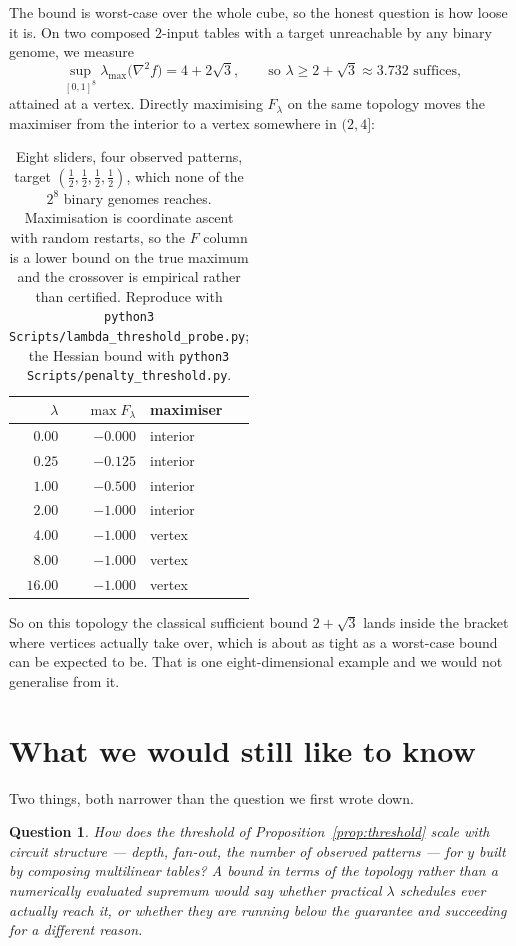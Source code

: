 \documentclass[11pt,a4paper]{article}
\newtheorem{question}{Question}
\begin{document}
The bound is worst-case over the whole cube, so the honest question is how loose
it is. On two composed $2$-input tables with a target unreachable by any binary
genome, we measure
\[
  \sup_{[0,1]^8}\lambda_{\max}\bigl(\nabla^2 f\bigr) = 4+2\sqrt3,
  \qquad\text{so } \lambda \ge 2+\sqrt3 \approx 3.732 \text{ suffices,}
\]
attained at a vertex. Directly maximising $F_\lambda$ on the same topology moves
the maximiser from the interior to a vertex somewhere in $(2,4]$:

\begin{table}[h]
\centering
\small
\begin{tabular}{@{}rrl@{}}
\toprule
$\lambda$ & $\max F_\lambda$ & maximiser \\
\midrule
$0.00$  & $-0.000$ & interior \\
$0.25$  & $-0.125$ & interior \\
$1.00$  & $-0.500$ & interior \\
$2.00$  & $-1.000$ & interior \\
$4.00$  & $-1.000$ & vertex \\
$8.00$  & $-1.000$ & vertex \\
$16.00$ & $-1.000$ & vertex \\
\bottomrule
\end{tabular}
\caption{Eight sliders, four observed patterns, target $(\tfrac12,\tfrac12,\tfrac12,\tfrac12)$,
which none of the $2^8$ binary genomes reaches. Maximisation is coordinate ascent
with random restarts, so the $F$ column is a lower bound on the true maximum and
the crossover is empirical rather than certified. Reproduce with
\texttt{python3 Scripts/lambda\_threshold\_probe.py}; the Hessian bound with
\texttt{python3 Scripts/penalty\_threshold.py}.}
\end{table}

So on this topology the classical sufficient bound $2+\sqrt3$ lands inside the
bracket where vertices actually take over, which is about as tight as a worst-case
bound can be expected to be. That is one eight-dimensional example and we would not
generalise from it.

\section{What we would still like to know}

Two things, both narrower than the question we first wrote down.

\begin{question}
\label{q:scaling}
How does the threshold of Proposition~\ref{prop:threshold} scale with circuit
structure --- depth, fan-out, the number of observed patterns --- for $y$ built by
composing multilinear tables? A bound in terms of the topology rather than a
numerically evaluated supremum would say whether practical $\lambda$ schedules
ever actually reach it, or whether they are running below the guarantee and
succeeding for a different reason.
\end{question}
\end{document}
